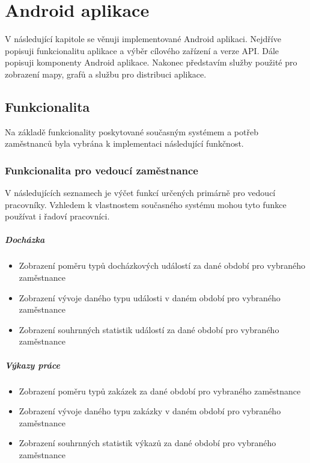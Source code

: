 \documentclass{diplomka}
\begin{document}
\chapter{Android aplikace}
V následující kapitole se věnuji implementované Android aplikaci. Nejdříve popisuji funkcionalitu aplikace a výběr cílového zařízení a verze API. Dále popisuji komponenty Android aplikace. Nakonec představím služby použité pro zobrazení mapy, grafů a službu pro distribuci aplikace.
\section{Funkcionalita}
Na základě funkcionality poskytované současným systémem a potřeb zaměstnanců byla vybrána k implementaci následující funkčnost.

\subsection{Funkcionalita pro vedoucí zaměstnance}
V následujících seznamech je výčet funkcí určených primárně pro vedoucí pracovníky. Vzhledem k vlastnostem současného systému mohou tyto funkce používat i řadoví pracovníci.

\paragraph{Docházka}
\begin{itemize}[noitemsep,nolistsep]
\item Zobrazení poměru typů docházkových událostí za dané období pro vybraného zaměstnance
\item Zobrazení vývoje daného typu události v daném období pro vybraného zaměstnance
\item Zobrazení souhrnných statistik událostí za dané období pro vybraného zaměstnance
\end{itemize}

\paragraph{Výkazy práce}
\begin{itemize}[noitemsep,nolistsep]
\item Zobrazení poměru typů zakázek za dané období pro vybraného zaměstnance
\item Zobrazení vývoje daného typu zakázky v daném období pro vybraného zaměstnance
\item Zobrazení souhrnných statistik výkazů za dané období pro vybraného zaměstnance
\end{itemize}
\end{document}
